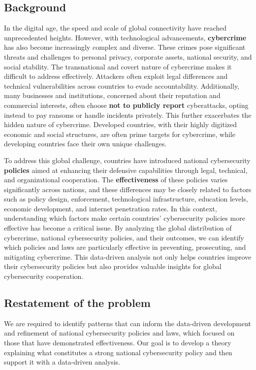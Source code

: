 \subsection{Background}\label{subsec:background} %
	In the digital age, the speed and scale of global connectivity have reached unprecedented heights.
	However, with technological advancements, \textbf{cybercrime} has also become increasingly complex and diverse.
	These crimes pose significant threats and challenges to personal privacy, corporate assets, national security, and social stability.
	The transnational and covert nature of cybercrime makes it difficult to address effectively.
	Attackers often exploit legal differences and technical vulnerabilities across countries to evade accountability.
	Additionally, many businesses and institutions, concerned about their reputation and commercial interests,
	often choose \textbf{not to publicly report} cyberattacks, opting instead to pay ransoms or handle incidents privately.
	This further exacerbates the hidden nature of cybercrime.
	Developed countries, with their highly digitized economic and social structures, are often prime targets for cybercrime, while
	developing countries face their own unique challenges.

	To address this global challenge, countries have introduced national cybersecurity \textbf{policies}
	aimed at enhancing their defensive capabilities through legal, technical, and organizational cooperation.
	The \textbf{effectiveness} of these policies varies significantly across nations, and these differences may be closely related to factors
	such as policy design, enforcement, technological infrastructure, education levels, economic development, and internet penetration rates.
	In this context, understanding which factors make certain countries' cybersecurity policies more effective has become a critical issue.
	By analyzing the global distribution of cybercrime, national cybersecurity policies, and their outcomes,
	we can identify which policies and laws are particularly effective in preventing, prosecuting, and mitigating cybercrime.
	This data-driven analysis not only helps countries improve their cybersecurity policies
	but also provides valuable insights for global cybersecurity cooperation.
\subsection{Restatement of the problem}\label{subsec:restatement-of-the-problem} %
	We are required to identify patterns
	that can inform the data-driven development and refinement of national cybersecurity policies and laws,
	which focused on those that have demonstrated effectiveness.
	Our goal is to develop a theory explaining what constitutes a strong national cybersecurity policy and then
	support it with a data-driven analysis.

